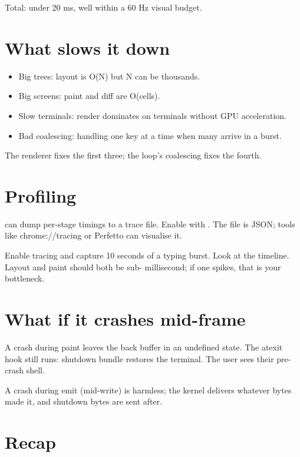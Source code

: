 Total: under 20 ms, well within a 60 Hz visual budget.

\section{What slows it down}

\begin{itemize}[leftmargin=*]
  \item Big trees: layout is O(N) but N can be thousands.
  \item Big screens: paint and diff are O(cells).
  \item Slow terminals: render dominates on terminals
    without GPU acceleration.
  \item Bad coalescing: handling one key at a time when many
    arrive in a burst.
\end{itemize}

The renderer fixes the first three; the loop's coalescing
fixes the fourth.

\section{Profiling}

\maya{} can dump per-stage timings to a trace file. Enable
with . The file is JSON; tools like
chrome://tracing or Perfetto can visualise it.

\begin{tryit}
Enable tracing and capture 10 seconds of a typing burst.
Look at the timeline. Layout and paint should both be sub-
millisecond; if one spikes, that is your bottleneck.
\end{tryit}

\section{What if it crashes mid-frame}

A crash during paint leaves the back buffer in an undefined
state. The atexit hook still runs: shutdown bundle restores
the terminal. The user sees their pre-crash shell.

A crash during emit (mid-write) is harmless; the kernel
delivers whatever bytes made it, and shutdown bytes are sent
after.

\section{Recap}


